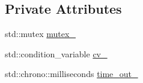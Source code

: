 \subsection*{Private Attributes}
\begin{DoxyCompactItemize}
\item 
std\-::mutex \hyperlink{classapollo_1_1cyber_1_1base_1_1TimeoutBlockWaitStrategy_a80b1e0c8b1eafa79aaf84b6bb1ff444e}{mutex\-\_\-}
\item 
std\-::condition\-\_\-variable \hyperlink{classapollo_1_1cyber_1_1base_1_1TimeoutBlockWaitStrategy_a8ca443c25600262b45e9edbb16b1d317}{cv\-\_\-}
\item 
std\-::chrono\-::milliseconds \hyperlink{classapollo_1_1cyber_1_1base_1_1TimeoutBlockWaitStrategy_a9dc28b4322af9a5dda67979eb1af0404}{time\-\_\-out\-\_\-}
\end{DoxyCompactItemize}


